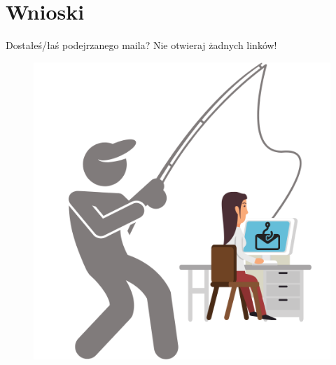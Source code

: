 \documentclass{beamer}
\begin{document}
\section{Wnioski}
\begin{frame}
\begin{center}
	\huge{Dostałeś/łaś podejrzanego maila? Nie otwieraj żadnych linków!}
\end{center}
\begin{figure}
	\centering
	\includegraphics[width=0.5\linewidth]{../images/rys_15}
\end{figure}
\end{frame}
\end{document}
